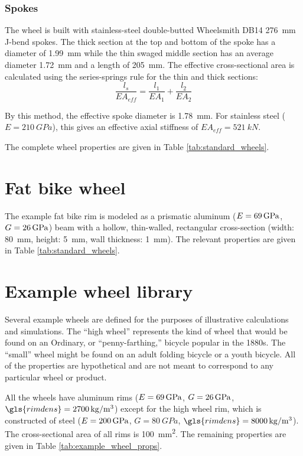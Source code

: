 \documentclass[../../thesis.tex]{subfiles}
\begin{document}
\subsubsection*{Spokes}
The wheel is built with stainless-steel double-butted Wheelsmith DB14 \SI{276}{mm} J-bend spokes. The thick section at the top and bottom of the spoke has a diameter of \SI{1.99}{mm} while the thin swaged middle section has an average diameter \SI{1.72}{mm} and a length of \SI{205}{mm}. The effective cross-sectional area is calculated using the series-springs rule for the thin and thick sections:
\begin{equation}
\frac{l_s}{EA_{eff}} = \frac{l_1}{EA_1} + \frac{l_2}{EA_2}
\end{equation}

By this method, the effective spoke diameter is \SI{1.78}{mm}. For stainless steel ($E = \SI{210}{GPa}$), this gives an effective axial stiffness of $EA_{eff} = \SI{521}{kN}$.

The complete wheel properties are given in Table \ref{tab:standard_wheels}.


\section{Fat bike wheel}
\label{app:fat_bike_wheel}

The example fat bike rim is modeled as a prismatic aluminum ($E=\SI{69}{GPa}$, $G=\SI{26}{GPa}$) beam with a hollow, thin-walled, rectangular cross-section (width: \SI{80}{mm}, height: \SI{5}{mm}, wall thickness: \SI{1}{mm}). The relevant properties are given in Table \ref{tab:standard_wheels}.


\section{Example wheel library}
\label{app:wheel_library}

Several example wheels are defined for the purposes of illustrative calculations and simulations. The ``high wheel'' represents the kind of wheel that would be found on an Ordinary, or ``penny-farthing,'' bicycle popular in the 1880s. The ``small'' wheel might be found on an adult folding bicycle or a youth bicycle. All of the properties are hypothetical and are not meant to correspond to any particular wheel or product.

All the wheels have aluminum rims ($E=\SI{69}{GPa}$, $G=\SI{26}{GPa}$, $\gls{rimdens}=\SI{2700}{kg/m^3}$) except for the high wheel rim, which is constructed of steel ($E=\SI{200}{GPa}$, $G=\SI{80}{GPa}$, $\gls{rimdens}=\SI{8000}{kg/m^3}$). The cross-sectional area of all rims is \SI{100}{mm^2}. The remaining properties are given in Table \ref{tab:example_wheel_props}.
\end{document}
